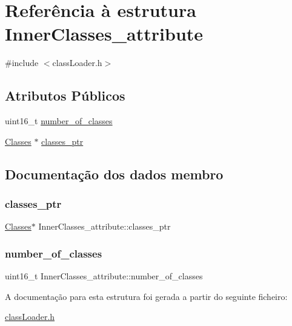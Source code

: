 \hypertarget{struct_inner_classes__attribute}{}\section{Referência à estrutura Inner\+Classes\+\_\+attribute}
\label{struct_inner_classes__attribute}


{\ttfamily \#include $<$class\+Loader.\+h$>$}

\subsection*{Atributos Públicos}
\begin{DoxyCompactItemize}
\item 
uint16\+\_\+t \hyperlink{struct_inner_classes__attribute_ab6907c663d3ea3688366d4afae4d733d}{number\+\_\+of\+\_\+classes}
\item 
\hyperlink{struct_classes}{Classes} $\ast$ \hyperlink{struct_inner_classes__attribute_a960fe320e13e7858453240314615c6d0}{classes\+\_\+ptr}
\end{DoxyCompactItemize}


\subsection{Documentação dos dados membro}
\hypertarget{struct_inner_classes__attribute_a960fe320e13e7858453240314615c6d0}{}\label{struct_inner_classes__attribute_a960fe320e13e7858453240314615c6d0} 
\subsubsection{\texorpdfstring{classes\+\_\+ptr}{classes\_ptr}}
{\footnotesize\ttfamily \hyperlink{struct_classes}{Classes}$\ast$ Inner\+Classes\+\_\+attribute\+::classes\+\_\+ptr}

\hypertarget{struct_inner_classes__attribute_ab6907c663d3ea3688366d4afae4d733d}{}\label{struct_inner_classes__attribute_ab6907c663d3ea3688366d4afae4d733d} 
\subsubsection{\texorpdfstring{number\+\_\+of\+\_\+classes}{number\_of\_classes}}
{\footnotesize\ttfamily uint16\+\_\+t Inner\+Classes\+\_\+attribute\+::number\+\_\+of\+\_\+classes}



A documentação para esta estrutura foi gerada a partir do seguinte ficheiro\+:\begin{DoxyCompactItemize}
\item 
\hyperlink{class_loader_8h}{class\+Loader.\+h}\end{DoxyCompactItemize}

